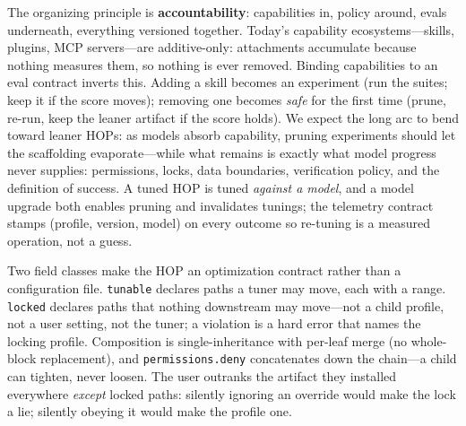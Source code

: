 \documentclass[10pt]{article}
\begin{document}
The organizing principle is \textbf{accountability}: capabilities in, policy around, evals
underneath, everything versioned together. Today's capability ecosystems---skills, plugins, MCP
servers---are additive-only: attachments accumulate because nothing measures them, so nothing is ever
removed. Binding capabilities to an eval contract inverts this. Adding a skill becomes an experiment
(run the suites; keep it if the score moves); removing one becomes \emph{safe} for the first time
(prune, re-run, keep the leaner artifact if the score holds). We expect the long arc to bend toward
leaner HOPs: as models absorb capability, pruning experiments should let the scaffolding
evaporate---while what remains is exactly what model progress never supplies: permissions, locks,
data boundaries, verification policy, and the definition of success. A tuned HOP is tuned
\emph{against a model}, and a model upgrade both enables pruning and invalidates tunings; the
telemetry contract stamps (profile, version, model) on every outcome so re-tuning is a measured
operation, not a guess.

Two field classes make the HOP an optimization contract rather than a configuration file.
\texttt{tunable} declares paths a tuner may move, each with a range. \texttt{locked} declares paths
that nothing downstream may move---not a child profile, not a user setting, not the tuner; a violation
is a hard error that names the locking profile. Composition is single-inheritance with per-leaf merge
(no whole-block replacement), and \texttt{permissions.deny} concatenates down the chain---a child can
tighten, never loosen. The user outranks the artifact they installed everywhere \emph{except} locked
paths: silently ignoring an override would make the lock a lie; silently obeying it would make the
profile one.
\end{document}
